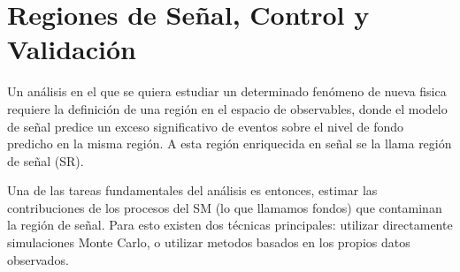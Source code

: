 



\section{Regiones de Señal, Control y Validación}

Un análisis en el que se quiera estudiar un determinado fenómeno de nueva fisica
requiere la definición de una región en el espacio de observables, donde el modelo de señal
predice un exceso significativo de eventos sobre el nivel de fondo predicho en
la misma región. A esta región enriquecida en señal se la llama región de señal
(SR).

Una de las tareas fundamentales del análisis es entonces, estimar las
contribuciones de los procesos del SM (lo que llamamos fondos) que contaminan la región de
señal.
Para esto existen dos técnicas principales: utilizar directamente simulaciones Monte Carlo,
o utilizar metodos basados en los propios datos observados.



